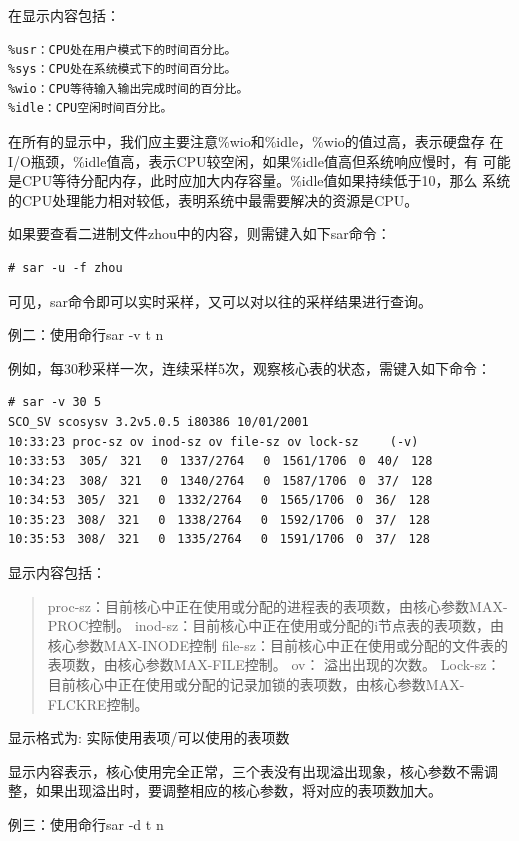 在显示内容包括：

\begin{verbatim}
%usr：CPU处在用户模式下的时间百分比。
%sys：CPU处在系统模式下的时间百分比。
%wio：CPU等待输入输出完成时间的百分比。
%idle：CPU空闲时间百分比。
\end{verbatim}

在所有的显示中，我们应主要注意\%wio和\%idle，\%wio的值过高，表示硬盘存
在I/O瓶颈，\%idle值高，表示CPU较空闲，如果\%idle值高但系统响应慢时，有
可能是CPU等待分配内存，此时应加大内存容量。\%idle值如果持续低于10，那么
系统的CPU处理能力相对较低，表明系统中最需要解决的资源是CPU。

如果要查看二进制文件zhou中的内容，则需键入如下sar命令：

\begin{verbatim}
# sar -u -f zhou
\end{verbatim}

可见，sar命令即可以实时采样，又可以对以往的采样结果进行查询。

例二：使用命行sar -v t n

例如，每30秒采样一次，连续采样5次，观察核心表的状态，需键入如下命令：

\begin{verbatim}
# sar -v 30 5
SCO_SV scosysv 3.2v5.0.5 i80386 10/01/2001
10:33:23 proc-sz ov inod-sz ov file-sz ov lock-sz　　 (-v)
10:33:53  305/　321 　0　1337/2764　 0　1561/1706　0　40/　128
10:34:23  308/　321 　0　1340/2764　 0　1587/1706　0　37/　128
10:34:53　305/　321 　0　1332/2764　 0　1565/1706　0　36/　128
10:35:23　308/　321 　0　1338/2764　 0　1592/1706　0　37/　128
10:35:53　308/　321　 0　1335/2764　 0　1591/1706　0　37/　128
\end{verbatim}

显示内容包括：

\begin{quote}
proc-sz：目前核心中正在使用或分配的进程表的表项数，由核心参数MAX-PROC控制。
inod-sz：目前核心中正在使用或分配的i节点表的表项数，由核心参数MAX-INODE控制
file-sz：目前核心中正在使用或分配的文件表的表项数，由核心参数MAX-FILE控制。
ov：     溢出出现的次数。
Lock-sz：目前核心中正在使用或分配的记录加锁的表项数，由核心参数MAX-FLCKRE控制。
\end{quote}

显示格式为: 实际使用表项/可以使用的表项数

显示内容表示，核心使用完全正常，三个表没有出现溢出现象，核心参数不需调
整，如果出现溢出时，要调整相应的核心参数，将对应的表项数加大。

例三：使用命行sar -d t n

